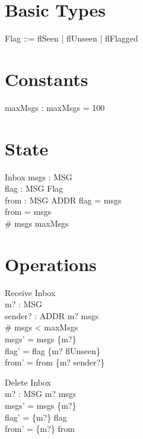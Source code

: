 \documentclass{article}
\begin{document}
\section{Basic Types}

\begin{zed}
\end{zed}

\begin{zed}
  Flag ::= flSeen | flUnseen | flFlagged
\end{zed}

\section{Constants}

\begin{axdef}
  maxMsgs : \nat
\where
  maxMsgs = 100
\end{axdef}

\section{State}

\begin{schema}{Inbox}
  msgs : \power MSG \\
  flag : MSG \pfun Flag \\
  from : MSG \pfun ADDR
\where
  \dom flag = msgs \\
  \dom from = msgs \\
  \# msgs \leq maxMsgs
\end{schema}

\section{Operations}

\begin{schema}{Receive}
  \Delta Inbox \\
  m? : MSG \\
  sender? : ADDR
\where
  m? \notin msgs \\
  \# msgs < maxMsgs \\
  msgs' = msgs \cup \{m?\} \\
  flag' = flag \cup \{m? \mapsto flUnseen\} \\
  from' = from \cup \{m? \mapsto sender?\}
\end{schema}

\begin{schema}{Delete}
  \Delta Inbox \\
  m? : MSG
\where
  m? \in msgs \\
  msgs' = msgs \setminus \{m?\} \\
  flag' = \{m?\} \ndres flag \\
  from' = \{m?\} \ndres from
\end{schema}
\end{document}

